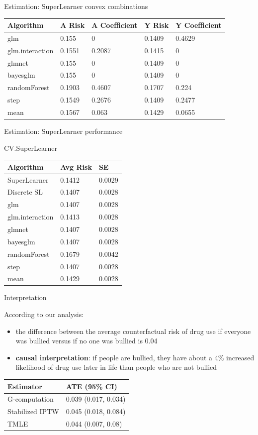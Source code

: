 \documentclass[ignorenonframetext,]{beamer}
\begin{document}
\begin{frame}{Estimation: SuperLearner convex combinations}

\begin{longtable}[]{@{}lllll@{}}
\toprule
Algorithm & A Risk & A Coefficient & Y Risk & Y
Coefficient\tabularnewline
\midrule
\endhead
glm & 0.155 & 0 & 0.1409 & 0.4629\tabularnewline
glm.interaction & 0.1551 & 0.2087 & 0.1415 & 0\tabularnewline
glmnet & 0.155 & 0 & 0.1409 & 0\tabularnewline
bayesglm & 0.155 & 0 & 0.1409 & 0\tabularnewline
randomForest & 0.1903 & 0.4607 & 0.1707 & 0.224\tabularnewline
step & 0.1549 & 0.2676 & 0.1409 & 0.2477\tabularnewline
mean & 0.1567 & 0.063 & 0.1429 & 0.0655\tabularnewline
\bottomrule
\end{longtable}

\end{frame}

\begin{frame}{Estimation: SuperLearner performance}

CV.SuperLearner

\begin{longtable}[]{@{}lll@{}}
\toprule
Algorithm & Avg Risk & SE\tabularnewline
\midrule
\endhead
SuperLearner & 0.1412 & 0.0029\tabularnewline
Discrete SL & 0.1407 & 0.0028\tabularnewline
glm & 0.1407 & 0.0028\tabularnewline
glm.interaction & 0.1413 & 0.0028\tabularnewline
glmnet & 0.1407 & 0.0028\tabularnewline
bayesglm & 0.1407 & 0.0028\tabularnewline
randomForest & 0.1679 & 0.0042\tabularnewline
step & 0.1407 & 0.0028\tabularnewline
mean & 0.1429 & 0.0028\tabularnewline
\bottomrule
\end{longtable}

\end{frame}

\begin{frame}{Interpretation}

According to our analysis:

\begin{itemize}
\item
  the difference between the average counterfactual risk of drug use if
  everyone was bullied versus if no one was bullied is 0.04
\item
  \textbf{causal interpretation}: if people are bullied, they have about
  a 4\% increased likelihood of drug use later in life than people who
  are not bullied
\end{itemize}

\begin{longtable}[]{@{}ll@{}}
\toprule
Estimator & ATE (95\% CI)\tabularnewline
\midrule
\endhead
G-computation & 0.039 (0.017, 0.034)\tabularnewline
Stabilized IPTW & 0.045 (0.018, 0.084)\tabularnewline
TMLE & 0.044 (0.007, 0.08)\tabularnewline
\bottomrule
\end{longtable}

\end{frame}
\end{document}
